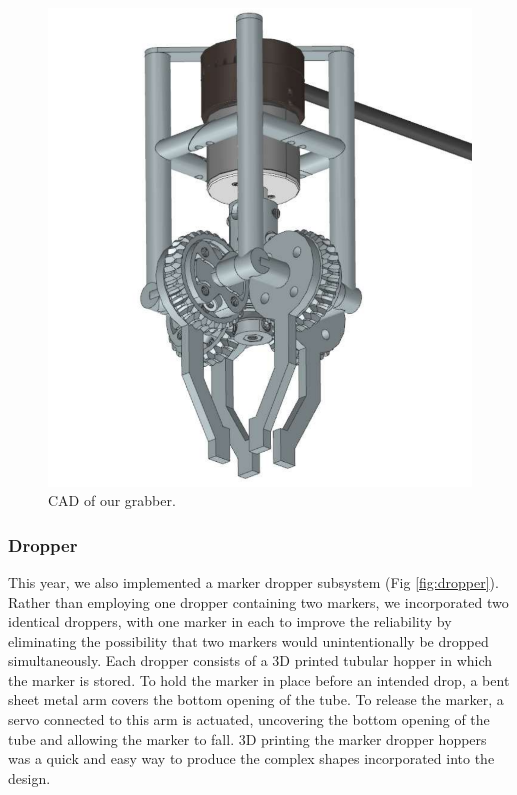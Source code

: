 \documentclass[conference]{IEEEtran}
\begin{document}
\begin{figure}
    \centerline{\includegraphics[scale=0.22]{images/grabber2025.png}}
    \caption{CAD of our grabber.}
    \label{fig:grabber}
\end{figure}

\subsubsection{Dropper}
\label{sssec:dropper}
This year, we also implemented a marker dropper subsystem (Fig \ref{fig:dropper}). Rather than employing one dropper containing two markers, we incorporated two identical droppers, with one marker in each to improve the reliability by eliminating the possibility that two markers would unintentionally be dropped simultaneously. Each dropper consists of a 3D printed tubular hopper in which the marker is stored. To hold the marker in place before an intended drop, a bent sheet metal arm covers the bottom opening of the tube. To release the marker, a servo connected to this arm is actuated, uncovering the bottom opening of the tube and allowing the marker to fall. 3D printing the marker dropper hoppers was a quick and easy way to produce the complex shapes incorporated into the design.
\end{document}
